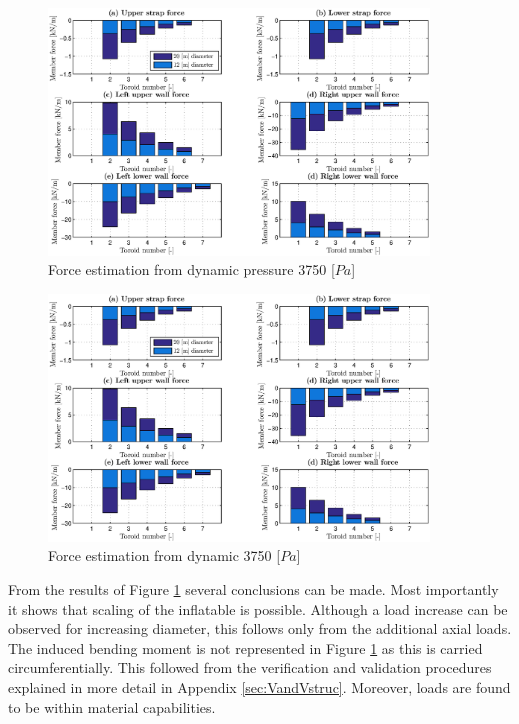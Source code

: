 \begin{figure}[h]
	\centering
	\includegraphics[width=0.9\textwidth]{./Figure/Structure/forces_test.eps}
	\caption{Force estimation from dynamic pressure 3750 [$Pa$]}
	\label{fig:forces}
\end{figure}

\begin{figure}[h]
	\centering
	\includegraphics[width=0.9\textwidth]{./Figure/Structure/forces_test.eps}
	\caption{Force estimation from dynamic 3750 [$Pa$]}
	\label{fig:forcesp}
\end{figure}


From the results of Figure \ref{fig:forces} several conclusions can be made. Most importantly it shows that scaling of the inflatable is possible. Although a load increase can be observed for increasing diameter, this follows only from the additional axial loads. The induced bending moment is not represented in Figure \ref{fig:forces} as this is carried circumferentially. This followed from the verification and validation procedures explained in more detail in Appendix \ref{sec:VandVstruc}. Moreover, loads are found to be within material capabilities.

